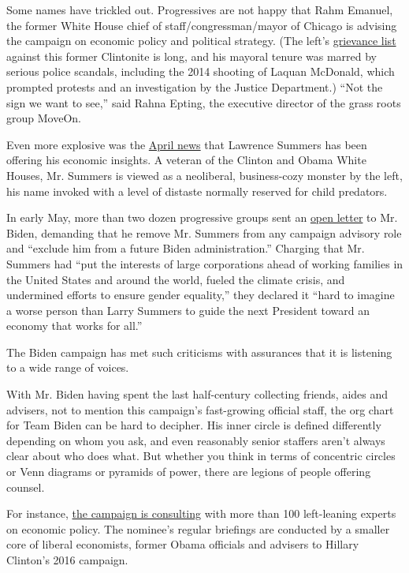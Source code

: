 Some names have trickled out. Progressives are not happy that Rahm
Emanuel, the former White House chief of staff/congressman/mayor of
Chicago is advising the campaign on economic policy and political
strategy. (The left's
\href{https://www.salon.com/2015/03/23/why_the_left_hates_this_man_rahm_emanuels_sins_against_the_progressive_movement/}{grievance
list} against this former Clintonite is long, and his mayoral tenure was
marred by serious police scandals, including the 2014 shooting of Laquan
McDonald, which prompted protests and an investigation by the Justice
Department.) ``Not the sign we want to see,'' said Rahna Epting, the
executive director of the grass roots group MoveOn.

Even more explosive was the
\href{https://www.bloomberg.com/news/articles/2020-04-23/larry-summers-advising-biden-campaign-on-economic-recovery}{April
news} that Lawrence Summers has been offering his economic insights. A
veteran of the Clinton and Obama White Houses, Mr. Summers is viewed as
a neoliberal, business-cozy monster by the left, his name invoked with a
level of distaste normally reserved for child predators.

In early May, more than two dozen progressive groups sent an
\href{https://assets.bwbx.io/documents/users/iqjWHBFdfxIU/rq88fcCcNRP8/v0}{open
letter} to Mr. Biden, demanding that he remove Mr. Summers from any
campaign advisory role and ``exclude him from a future Biden
administration.'' Charging that Mr. Summers had ``put the interests of
large corporations ahead of working families in the United States and
around the world, fueled the climate crisis, and undermined efforts to
ensure gender equality,'' they declared it ``hard to imagine a worse
person than Larry Summers to guide the next President toward an economy
that works for all.''

The Biden campaign has met such criticisms with assurances that it is
listening to a wide range of voices.

With Mr. Biden having spent the last half-century collecting friends,
aides and advisers, not to mention this campaign's fast-growing official
staff, the org chart for Team Biden can be hard to decipher. His inner
circle is defined differently depending on whom you ask, and even
reasonably senior staffers aren't always clear about who does what. But
whether you think in terms of concentric circles or Venn diagrams or
pyramids of power, there are legions of people offering counsel.

For instance,
\href{https://www.nytimes.com/2020/06/11/us/politics/joe-biden-campaign-economy.html}{the
campaign is consulting} with more than 100 left-leaning experts on
economic policy. The nominee's regular briefings are conducted by a
smaller core of liberal economists, former Obama officials and advisers
to Hillary Clinton's 2016 campaign.

